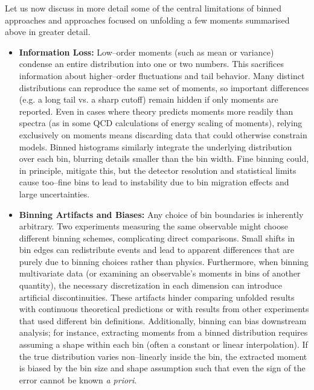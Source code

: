     Let us now discuss in more detail some of the central limitations of binned approaches and approaches focused on unfolding a few moments summarised above in greater detail.
    \begin{itemize}
        \item \textbf{Information Loss:}
            Low--order moments (such as mean or variance) condense an entire distribution into one or two numbers.
            This sacrifices information about higher--order fluctuations and tail behavior.
            Many distinct distributions can reproduce the same set of moments, so important differences (e.g. a long tail vs. a sharp cutoff) remain hidden if only moments are reported.
            Even in cases where theory predicts moments more readily than spectra (as in some QCD calculations of energy scaling of moments), relying exclusively on moments means discarding data that could otherwise constrain models.
            Binned histograms similarly integrate the underlying distribution over each bin, blurring details smaller than the bin width.
            Fine binning could, in principle, mitigate this, but the detector resolution and statistical limits cause too--fine bins to lead to instability due to bin migration effects  and large uncertainties.
        \item \textbf{Binning Artifacts and Biases:}
            Any choice of bin boundaries is inherently arbitrary.
            Two experiments measuring the same observable might choose different binning schemes, complicating direct comparisons.
            Small shifts in bin edges can redistribute events and lead to apparent differences that are purely due to binning choices rather than physics.
            Furthermore, when binning multivariate data (or examining an observable’s moments in bins of another quantity), the necessary discretization in each dimension can introduce artificial discontinuities.
            These artifacts hinder comparing unfolded results with continuous theoretical predictions or with results from other experiments that used different bin definitions.
            Additionally, binning can bias downstream analysis;
            for instance, extracting moments from a binned distribution requires assuming a shape within each bin (often a constant or linear interpolation).
            If the true distribution varies non--linearly inside the bin, the extracted moment is biased by the bin size and shape assumption such that even the sign of the error cannot be known \textit{a priori}.

\end{itemize}
